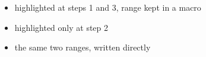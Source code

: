 
\begin{frame}

    \newcommand{\rangeFirstAndThird}{1-1, 3-3}
    \newcommand{\rangeSecond}{2-2}

    \begin{itemize}\setlength\itemsep{1em}
        \item \alert<\rangeFirstAndThird>{highlighted at steps 1 and 3, range kept in a macro}
        \item \alert<\rangeSecond>{highlighted only at step 2}
        \item \alert<1-1, 3-3>{the same two ranges, written directly}
    \end{itemize}

    \vspace{1em}

    \begin{center}
    \end{center}

\end{frame}
